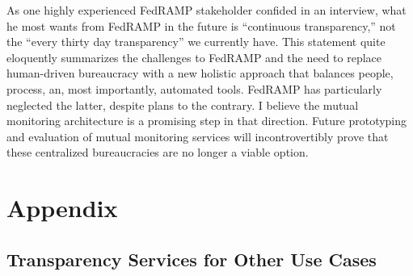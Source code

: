 \documentclass{jdf}
\begin{document}
As one highly experienced FedRAMP stakeholder confided in an interview, what he most wants from FedRAMP in the future is ``continuous transparency,'' not the ``every thirty day transparency'' we currently have. This statement quite eloquently summarizes the challenges to FedRAMP and the need to replace human-driven bureaucracy with a new holistic approach that balances people, process, an, most importantly, automated tools. FedRAMP has particularly neglected the latter, despite plans to the contrary. I believe the mutual monitoring architecture is a promising step in that direction. Future prototyping and evaluation of mutual monitoring services will incontrovertibly prove that these centralized bureaucracies are no longer a viable option.




\section{Appendix}

\subsection{Transparency Services for Other Use Cases} \label{use_cases}
\end{document}
